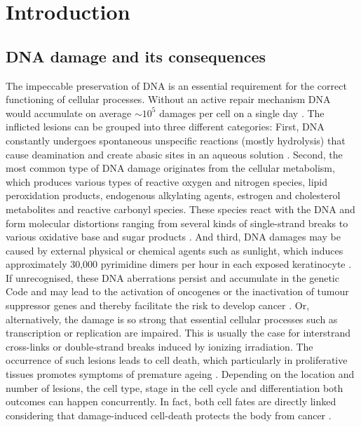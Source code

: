 \chapter{Introduction}
\pagestyle{plain}

\section{DNA damage and its consequences}

The impeccable preservation of DNA is an essential requirement for the correct functioning of cellular processes. Without an active repair mechanism DNA would accumulate on average $\sim$$\text{10}^\text{5}$ damages per cell on a single day \cite{Hoeijmakers2009}. The inflicted lesions can be grouped into three different categories: First, DNA constantly undergoes spontaneous unspecific reactions (mostly hydrolysis) that cause deamination and create abasic sites in an aqueous solution \cite{Lindahl1993,Lhomme1999}. Second, the most common type of DNA damage originates from the cellular metabolism, which produces various types of reactive oxygen and nitrogen species, lipid peroxidation products, endogenous alkylating agents, estrogen and cholesterol metabolites and reactive carbonyl species. These species react with the DNA and form molecular distortions ranging from several kinds of single-strand breaks to various oxidative base and sugar products \cite{DeBont2004,Sander2005}. And third, DNA damages may be caused by external physical or chemical agents such as sunlight, which induces approximately 30,000 pyrimidine dimers per hour in each exposed keratinocyte \cite{Luijsterburg2010}.\\        
If unrecognised, these DNA aberrations persist and accumulate in the genetic Code and may lead to the activation of  oncogenes or the inactivation of tumour suppressor genes and thereby facilitate the risk to develop cancer \cite{Bartek2007}. Or, alternatively, the damage is so strong that essential cellular processes such as transcription or replication are impaired. This is usually the case for interstrand cross-links or double-strand breaks induced by ionizing irradiation. The occurrence of such lesions leads to cell death, which particularly in proliferative tissues promotes symptoms of premature ageing \cite{Marteijn2014}. Depending on the location and number of lesions, the cell type, stage in the cell cycle and differentiation both outcomes can happen concurrently. In fact, both cell fates are directly linked considering that damage-induced cell-death protects the body from cancer \cite{Hoeijmakers2009}.            


